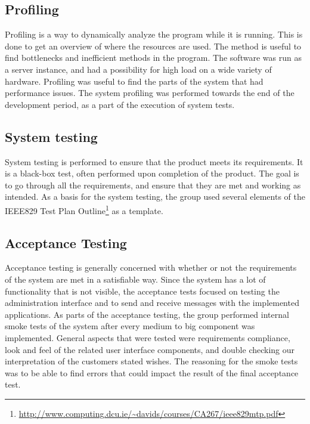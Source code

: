 \subsection{Profiling}
\label{subsec:testing-test_description-profiling}

Profiling is a way to dynamically analyze the program while it is running. This is done to get an overview of where the resources are used. The method is useful to find bottlenecks and inefficient methods in the program. The software was run as a server instance, and had a possibility for high load on a wide variety of hardware. Profiling was useful to find the parts of the system that had performance issues. The system profiling was performed towards the end of the development period, as a part of the execution of system tests.

\subsection{System testing}
\label{subsec:testing-test_description-system_testing}

System testing is performed to ensure that the product meets its requirements. It is a black-box test, often performed upon completion of the product. The goal is to go through all the requirements, and ensure that they are met and working as intended. As a basis for the system testing, the group used several elements of the IEEE829 Test Plan Outline\footnote{\url{http://www.computing.dcu.ie/~davids/courses/CA267/ieee829mtp.pdf}} as a template.

\subsection{Acceptance Testing}
\label{subsec:testing-test_description-acceptance_testing}
Acceptance testing is generally concerned with whether or not the requirements of the system are met in a satisfiable way. Since the system has a lot of functionality that is not visible, the acceptance tests focused on testing the administration interface and to send and receive messages with the implemented applications.
As parts of the acceptance testing, the group performed internal smoke tests of the system after every medium to big component was implemented. General aspects that were tested were requirements compliance, look and feel of the related user interface components, and double checking our interpretation of the customers stated wishes. The reasoning for the smoke tests was to be able to find errors that could impact the result of the final acceptance test.

